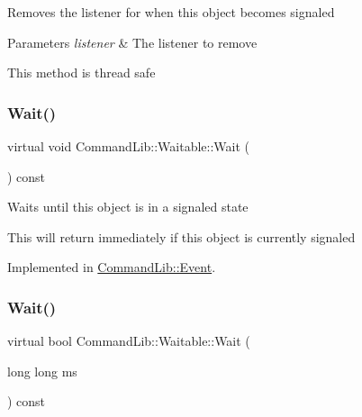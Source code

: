 Removes the listener for when this object becomes signaled


\begin{DoxyParams}{Parameters}
{\em listener} & The listener to remove\\
\hline
\end{DoxyParams}


This method is thread safe\mbox{\label{class_command_lib_1_1_waitable_aa3916ede3b2ca9bed013a4e256e081da}} 
\subsubsection{\texorpdfstring{Wait()}{Wait()}\hspace{0.1cm}{\footnotesize\ttfamily [1/2]}}
{\footnotesize\ttfamily virtual void Command\+Lib\+::\+Waitable\+::\+Wait (\begin{DoxyParamCaption}{ }\end{DoxyParamCaption}) const\hspace{0.3cm}{\ttfamily [pure virtual]}}



Waits until this object is in a signaled state

This will return immediately if this object is currently signaled 

Implemented in \mbox{\hyperlink{class_command_lib_1_1_event_a26986edd42eaa6b85b5a4ddc32af60ae}{Command\+Lib\+::\+Event}}.

\mbox{\label{class_command_lib_1_1_waitable_ad5f9233b05a3ca2bce4ec572bfb82f4b}} 
\subsubsection{\texorpdfstring{Wait()}{Wait()}\hspace{0.1cm}{\footnotesize\ttfamily [2/2]}}
{\footnotesize\ttfamily virtual bool Command\+Lib\+::\+Waitable\+::\+Wait (\begin{DoxyParamCaption}\item[{long long}]{ms }\end{DoxyParamCaption}) const\hspace{0.3cm}{\ttfamily [pure virtual]}}



